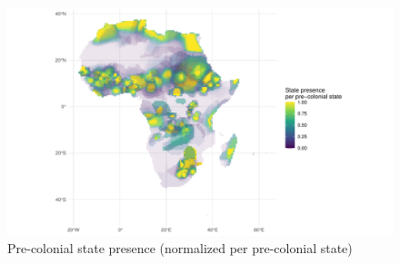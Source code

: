 %

\begin{figure}[hbpt]
	\centering
	\includegraphics[width=\textwidth]{img/geo_isd_all.pdf}
	\caption{Pre-colonial state presence (normalized per pre-colonial state)}
	\label{spnorm}
\end{figure}


